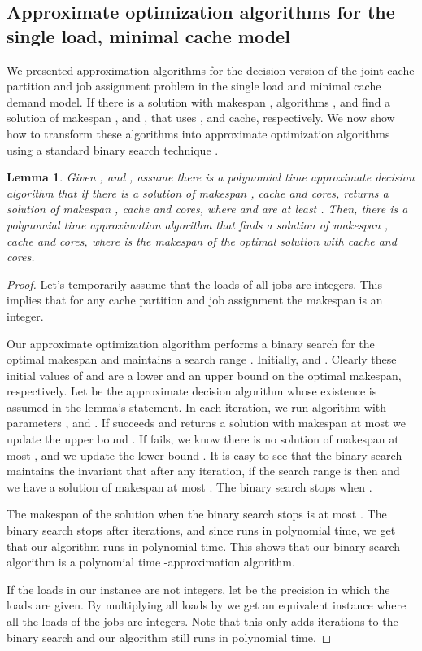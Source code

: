 \documentclass[11pt]{article}
\newtheorem{lemma}[theorem]{Lemma}
\begin{document}
\subsection{Approximate optimization algorithms for the single load, minimal cache model }\label{apn_approx_des_to_opt}
We presented approximation algorithms for the decision version of the joint cache partition and job assignment problem in the single load and minimal cache demand model.
If there is a solution with makespan , algorithms ,  and  find a solution of makespan ,  and , that uses ,  and  cache, respectively.
We now show how to transform these algorithms into approximate optimization algorithms using a standard binary search technique \cite{LST90}.

\begin{lemma}\label{bin_opt}
Given ,  and , assume there is a polynomial time approximate decision algorithm that if there is a solution of makespan ,  cache and  cores, returns a solution of makespan ,  cache and  cores,  where  and  are at least . Then, there is a polynomial time approximation algorithm that finds a solution of makespan ,  cache and  cores, where  is the makespan of the optimal solution with  cache and  cores.
\end{lemma}

\begin{proof}
Let's temporarily assume that the loads of all jobs are integers.
This implies that for any cache partition and job assignment the makespan is an integer.

Our approximate optimization algorithm performs a binary search for the optimal makespan and maintains a search range .
Initially,  and .
Clearly these initial values of  and  are a lower and an upper bound on the optimal makespan, respectively.
Let  be the approximate decision algorithm whose existence is assumed in the lemma's statement.
In each iteration, we run algorithm  with parameters ,  and .
If  succeeds and returns a solution with makespan at most  we update the upper bound .
If  fails, we know there is no solution of makespan at most , and we update the lower bound .
It is easy to see that the binary search maintains the invariant that after any iteration, if the search range is  then  and we have a solution of makespan at most . The binary search stops when .

The makespan of the solution when the binary search stops is at most . The binary search stops after  iterations, and since  runs in polynomial time, we get that our algorithm runs in polynomial time.
This shows that our binary search algorithm is a polynomial time -approximation algorithm.

If the loads in our instance are not integers, let  be the precision in which the loads are given.
By multiplying all loads by  we get an equivalent instance where all the loads of the jobs are integers.
Note that this only adds  iterations to the binary search and our algorithm still runs in polynomial time.
\end{proof}
\end{document}
